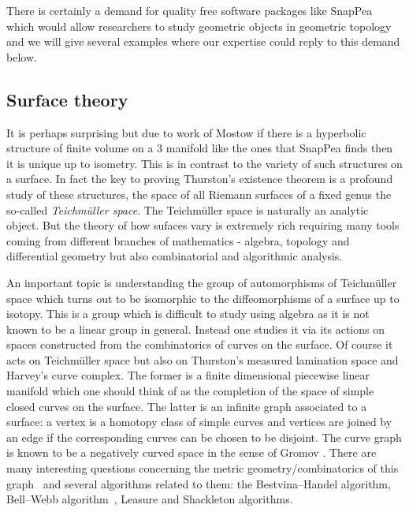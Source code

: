 \documentclass[14pt,fleqn]{article}
\begin{document}
There is certainly a demand for quality free software packages  like SnapPea  which  would allow researchers 
to study geometric objects 
in geometric topology
and 
we will give several examples 
where our expertise could 
reply to this demand below. 



\subsection{Surface theory}


It is perhaps surprising but due to work of Mostow \cite{mostow}
if there is a hyperbolic structure of finite volume on a 3 manifold like the ones that SnapPea finds 
then it is unique up to isometry.
This is in contrast 
to the variety of such structures 
on a surface.
In fact the key to proving Thurston's existence
theorem is a profound study of these 
structures, the
space of all Riemann surfaces of a fixed genus
the so-called \textit{Teichm\"uller space}.
The Teichm\"uller space is naturally an analytic object.
But the theory of
how sufaces vary is extremely rich 
requiring many tools coming
from different branches of mathematics - algebra, topology and
differential geometry but also combinatorial and algorithmic analysis.



An important topic is understanding
the group of automorphisms of 
Teichm\"uller space 
which turns out to be isomorphic to 
the diffeomorphisms of a surface
up to isotopy. 
This is a group which 
is difficult to study using algebra
as it is not known 
to be a linear group in general.
Instead one studies it via its actions on
spaces constructed 
from the combinatorics of curves on the surface. 
Of course  it acts on Teichm\"{u}ller space
but also on 
Thurston’s measured
lamination space \cite{FLP}
 and Harvey’s curve complex. 
The former is a finite dimensional 
piecewise linear manifold 
which one should think of 
as the completion of the space of 
simple closed curves on the surface.
The latter is an infinite
graph associated to a surface: a vertex is a homotopy class of simple
curves and vertices are joined by an edge if the corresponding curves
can be chosen to be disjoint. 
The curve graph is known to be a negatively curved 
space in the sense of Gromov \cite{MM}.
There are many interesting questions
concerning the metric geometry/combinatorics of this graph~\cite{bmm-egead-16} and several
algorithms related to them: the Bestvina–Handel algorithm, Bell–Webb
algorithm~\cite{bw-ptacg-16}, Leasure and Shackleton algorithms.
\end{document}
